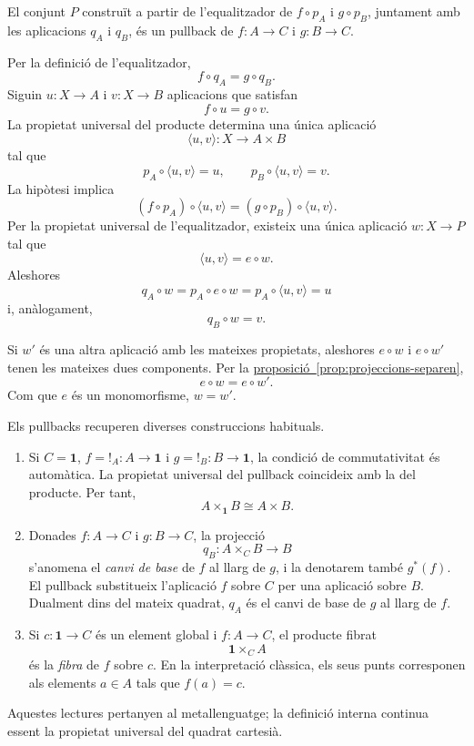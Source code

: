 \begin{teorema}\label{teo:pullback-universal}
El conjunt \(P\) construït a partir de l'equalitzador de \(f\circ p_A\) i \(g\circ p_B\), juntament amb les aplicacions \(q_A\) i \(q_B\), és un pullback de \(f:A\to C\) i \(g:B\to C\).
\end{teorema}

\begin{prova}
Per la definició de l'equalitzador,
\[
f\circ q_A=g\circ q_B.
\]
Siguin \(u:X\to A\) i \(v:X\to B\) aplicacions que satisfan
\[
f\circ u=g\circ v.
\]
La propietat universal del producte determina una única aplicació
\[
\langle u,v\rangle:X\to A\times B
\]
tal que
\[
p_A\circ\langle u,v\rangle=u,
\qquad
p_B\circ\langle u,v\rangle=v.
\]
La hipòtesi implica
\[
(f\circ p_A)\circ\langle u,v\rangle
=(g\circ p_B)\circ\langle u,v\rangle.
\]
Per la propietat universal de l'equalitzador, existeix una única aplicació \(w:X\to P\) tal que
\[
\langle u,v\rangle=e\circ w.
\]
Aleshores
\[
q_A\circ w=p_A\circ e\circ w=p_A\circ\langle u,v\rangle=u
\]
i, anàlogament,
\[
q_B\circ w=v.
\]

Si \(w'\) és una altra aplicació amb les mateixes propietats, aleshores \(e\circ w\) i \(e\circ w'\) tenen les mateixes dues components. Per la \hyperref[prop:projeccions-separen]{proposició~\ref*{prop:projeccions-separen}},
\[
e\circ w=e\circ w'.
\]
Com que \(e\) és un monomorfisme, \(w=w'\).
\end{prova}

\begin{observacio}\label{obs:pullback-exemples}
Els pullbacks recuperen diverses construccions habituals.
\begin{enumerate}
\item Si \(C=\mathbf1\), \(f={!}_A:A\to\mathbf1\) i \(g={!}_B:B\to\mathbf1\), la condició de commutativitat és automàtica. La propietat universal del pullback coincideix amb la del producte. Per tant,
\[
A\times_{\mathbf1}B\cong A\times B.
\]
\item Donades \(f:A\to C\) i \(g:B\to C\), la projecció
\[
q_B:A\times_C B\to B
\]
s'anomena el \emph{canvi de base} de \(f\) al llarg de \(g\), i la denotarem també \(g^{*}(f)\). El pullback substitueix l'aplicació \(f\) sobre \(C\) per una aplicació sobre \(B\). Dualment dins del mateix quadrat, \(q_A\) és el canvi de base de \(g\) al llarg de \(f\).
\item Si \(c:\mathbf1\to C\) és un element global i \(f:A\to C\), el producte fibrat
\[
\mathbf1\times_C A
\]
és la \emph{fibra} de \(f\) sobre \(c\). En la interpretació clàssica, els seus punts corresponen als elements \(a\in A\) tals que \(f(a)=c\).
\end{enumerate}
Aquestes lectures pertanyen al metallenguatge; la definició interna continua essent la propietat universal del quadrat cartesià.
\end{observacio}

